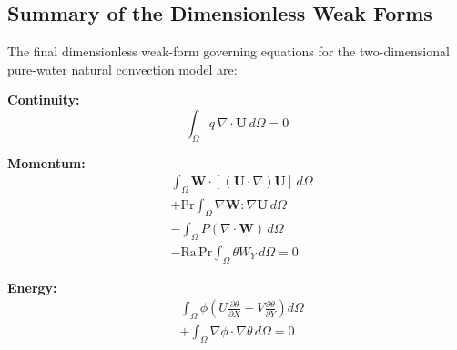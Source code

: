 \documentclass[preprint,3p,number]{elsarticle}
\begin{document}
\subsection{Summary of the Dimensionless Weak Forms}

The final dimensionless weak-form governing equations for the
two-dimensional pure-water natural convection model are:

\textbf{Continuity:}
\begin{equation}
\int_{\Omega}q\,\nabla\cdot\mathbf{U}\,d\Omega=0
\end{equation}

\textbf{Momentum:}
\begin{equation}
\begin{aligned}
&\int_{\Omega}\mathbf{W}\cdot
[(\mathbf{U}\cdot\nabla)\mathbf{U}]\,d\Omega\\
&+\mathrm{Pr}\int_{\Omega}
\nabla\mathbf{W}:\nabla\mathbf{U}\,d\Omega\\
&-\int_{\Omega}P(\nabla\cdot\mathbf{W})\,d\Omega\\
&-\mathrm{Ra}\,\mathrm{Pr}
\int_{\Omega}\theta W_Y\,d\Omega=0
\end{aligned}
\end{equation}

\textbf{Energy:}
\begin{equation}
\begin{aligned}
&\int_{\Omega}\phi
\left(
U\frac{\partial\theta}{\partial X}
+V\frac{\partial\theta}{\partial Y}
\right)d\Omega\\
&+\int_{\Omega}\nabla\phi\cdot\nabla\theta\,d\Omega=0
\end{aligned}
\end{equation}
\end{document}
